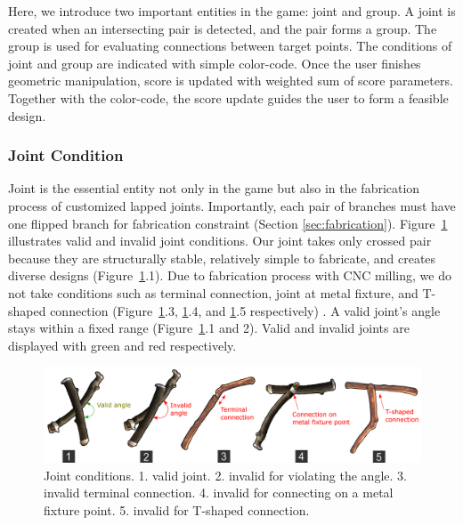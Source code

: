 Here, we introduce two important entities in the game: joint and group.
A joint is created when an intersecting pair is detected, and the pair forms a group.
The group is used for evaluating connections between target points.
The conditions of joint and group are indicated with simple color-code.
Once the user finishes geometric manipulation, score is updated with weighted sum of score parameters.
Together with the color-code, the score update guides the user to form a feasible design.



\subsubsection{Joint Condition}
\label{sec:joint}
Joint is the essential entity not only in the game but also in the fabrication process of customized lapped joints.
Importantly, each pair of branches must have one flipped branch for fabrication constraint (Section \ref{sec:fabrication}).
Figure~\ref{fig:joint_condition} illustrates valid and invalid joint conditions.
Our joint takes only crossed pair because they are structurally stable, relatively simple to fabricate, and creates diverse designs (Figure~\ref{fig:joint_condition}.1). 
Due to fabrication process with CNC milling, we do not take conditions such as terminal connection, joint at metal fixture, and T-shaped connection (Figure~\ref{fig:joint_condition}.3, \ref{fig:joint_condition}.4, and \ref{fig:joint_condition}.5 respectively) .
A valid joint's angle stays within a fixed range (Figure~\ref{fig:joint_condition}.1 and 2).
Valid and invalid joints are displayed with green and red respectively.

\begin{figure}[ht]
	\begin{center}
		\includegraphics[width = 0.4\paperwidth]{images/system/joint_conditions_3.png}
		\caption{Joint conditions. 1. valid joint. 2. invalid for violating the angle. 3. invalid terminal connection. 4. invalid for connecting on a metal fixture point. 5. invalid for T-shaped connection.}
		\label{fig:joint_condition}
	\end{center}
\end{figure}




